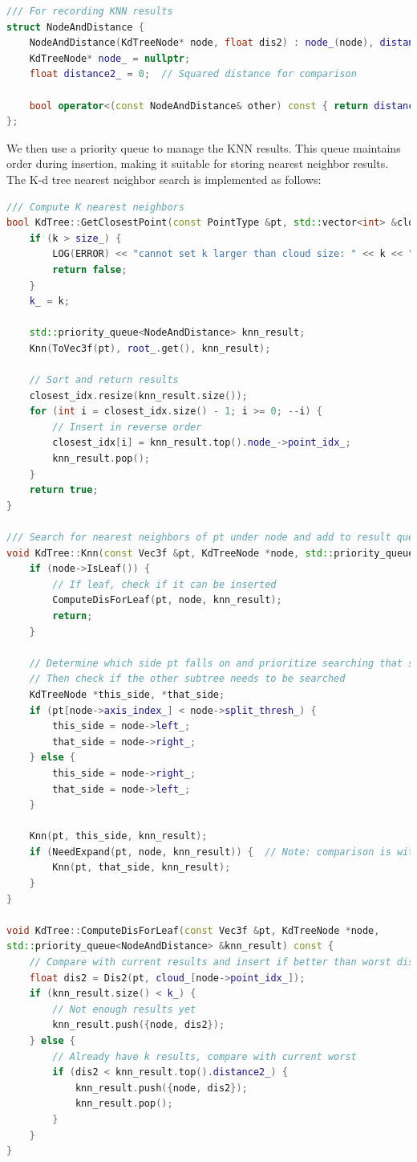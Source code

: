 \begin{lstlisting}[language=c++,caption=src/ch5/kdtree.h]
/// For recording KNN results
struct NodeAndDistance {
	NodeAndDistance(KdTreeNode* node, float dis2) : node_(node), distance2_(dis2) {}
	KdTreeNode* node_ = nullptr;
	float distance2_ = 0;  // Squared distance for comparison
	
	bool operator<(const NodeAndDistance& other) const { return distance2_ < other.distance2_; }
};
\end{lstlisting}

We then use a priority queue to manage the KNN results. This queue maintains order during insertion, making it suitable for storing nearest neighbor results. The K-d tree nearest neighbor search is implemented as follows:

\begin{lstlisting}[language=c++,caption=src/ch5/kdtree.cc]
/// Compute K nearest neighbors
bool KdTree::GetClosestPoint(const PointType &pt, std::vector<int> &closest_idx, int k) {
	if (k > size_) {
		LOG(ERROR) << "cannot set k larger than cloud size: " << k << ", " << size_;
		return false;
	}
	k_ = k;
	
	std::priority_queue<NodeAndDistance> knn_result;
	Knn(ToVec3f(pt), root_.get(), knn_result);
	
	// Sort and return results
	closest_idx.resize(knn_result.size());
	for (int i = closest_idx.size() - 1; i >= 0; --i) {
		// Insert in reverse order
		closest_idx[i] = knn_result.top().node_->point_idx_;
		knn_result.pop();
	}
	return true;
}

/// Search for nearest neighbors of pt under node and add to result queue
void KdTree::Knn(const Vec3f &pt, KdTreeNode *node, std::priority_queue<NodeAndDistance> &knn_result) const {
	if (node->IsLeaf()) {
		// If leaf, check if it can be inserted
		ComputeDisForLeaf(pt, node, knn_result);
		return;
	}
	
	// Determine which side pt falls on and prioritize searching that subtree
	// Then check if the other subtree needs to be searched
	KdTreeNode *this_side, *that_side;
	if (pt[node->axis_index_] < node->split_thresh_) {
		this_side = node->left_;
		that_side = node->right_;
	} else {
		this_side = node->right_;
		that_side = node->left_;
	}
	
	Knn(pt, this_side, knn_result);
	if (NeedExpand(pt, node, knn_result)) {  // Note: comparison is with current best
		Knn(pt, that_side, knn_result);
	}
}

void KdTree::ComputeDisForLeaf(const Vec3f &pt, KdTreeNode *node,
std::priority_queue<NodeAndDistance> &knn_result) const {
	// Compare with current results and insert if better than worst distance
	float dis2 = Dis2(pt, cloud_[node->point_idx_]);
	if (knn_result.size() < k_) {
		// Not enough results yet
		knn_result.push({node, dis2});
	} else {
		// Already have k results, compare with current worst
		if (dis2 < knn_result.top().distance2_) {
			knn_result.push({node, dis2});
			knn_result.pop();
		}
	}
}


\end{lstlisting}
